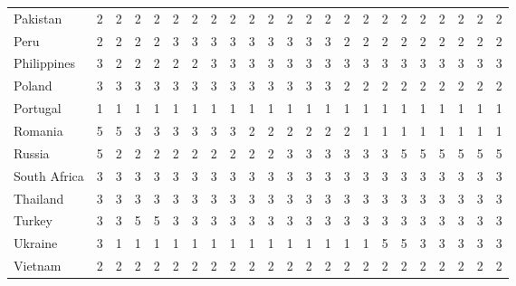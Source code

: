 \documentclass{article}
\begin{document}
\begin{table}[htbp]
\begin{adjustwidth}{-3cm}{}
\begin{tabular}{lcccccccccccccccccccccc}
    Pakistan & 2     & 2     & 2     & 2     & 2     & 2     & 2     & 2     & 2     & 2     & 2     & 2     & 2     & 2     & 2     & 2     & 2     & 2     & 2     & 2     & 2     & 2 \\
    Peru  & 2     & 2     & 2     & 2     & 3     & 3     & 3     & 3     & 3     & 3     & 3     & 3     & 3     & 2     & 2     & 2     & 2     & 2     & 2     & 2     & 2     & 2 \\
    Philippines & 3     & 2     & 2     & 2     & 2     & 2     & 3     & 3     & 3     & 3     & 3     & 3     & 3     & 3     & 3     & 3     & 3     & 3     & 3     & 3     & 3     & 3 \\
    Poland & 3     & 3     & 3     & 3     & 3     & 3     & 3     & 3     & 3     & 3     & 3     & 3     & 3     & 2     & 2     & 2     & 2     & 2     & 2     & 2     & 2     & 2 \\
    Portugal & 1     & 1     & 1     & 1     & 1     & 1     & 1     & 1     & 1     & 1     & 1     & 1     & 1     & 1     & 1     & 1     & 1     & 1     & 1     & 1     & 1     & 1 \\
    Romania & 5     & 5     & 3     & 3     & 3     & 3     & 3     & 3     & 2     & 2     & 2     & 2     & 2     & 2     & 1     & 1     & 1     & 1     & 1     & 1     & 1     & 1 \\
    Russia & 5     & 2     & 2     & 2     & 2     & 2     & 2     & 2     & 2     & 2     & 3     & 3     & 3     & 3     & 3     & 3     & 5     & 5     & 5     & 5     & 5     & 5 \\
    South Africa & 3     & 3     & 3     & 3     & 3     & 3     & 3     & 3     & 3     & 3     & 3     & 3     & 3     & 3     & 3     & 3     & 3     & 3     & 3     & 3     & 3     & 3 \\
    Thailand & 3     & 3     & 3     & 3     & 3     & 3     & 3     & 3     & 3     & 3     & 3     & 3     & 3     & 3     & 3     & 3     & 3     & 3     & 3     & 3     & 3     & 3 \\
    Turkey & 3     & 3     & 5     & 5     & 3     & 3     & 3     & 3     & 3     & 3     & 3     & 3     & 3     & 3     & 3     & 3     & 3     & 3     & 3     & 3     & 3     & 3 \\
    Ukraine & 3     & 1     & 1     & 1     & 1     & 1     & 1     & 1     & 1     & 1     & 1     & 1     & 1     & 1     & 1     & 5     & 5     & 3     & 3     & 3     & 3     & 3 \\
    Vietnam & 2     & 2     & 2     & 2     & 2     & 2     & 2     & 2     & 2     & 2     & 2     & 2     & 2     & 2     & 2     & 2     & 2     & 2     & 2     & 2     & 2     & 2 \\
    \bottomrule
    \end{tabular}%
  \label{IMFX}%
  \end{adjustwidth}
\end{table}%
\end{document}

